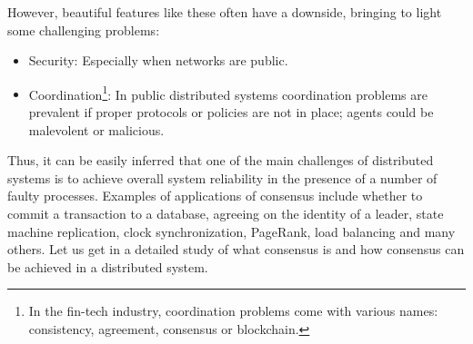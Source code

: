 \bigskip
\noindent
However, beautiful features like these often have a downside, bringing to light some challenging problems:
\begin{itemize}
    \item Security: Especially when networks are public.
    \item Coordination\footnote{In the fin-tech industry, coordination problems come with various names: consistency, agreement, consensus or blockchain.}: In public distributed systems coordination problems are prevalent if proper protocols or policies are not in place; agents could be malevolent or malicious.
\end{itemize}
Thus, it can be easily inferred that one of the main challenges of distributed systems is to achieve overall system reliability in the presence of a number of faulty processes. Examples of applications of consensus include whether to commit a transaction to a database, agreeing on the identity of a leader, state machine replication, clock synchronization, PageRank, load balancing and many others. Let us get in a detailed study of what consensus is and how consensus can be achieved in a distributed system.

\bigskip
